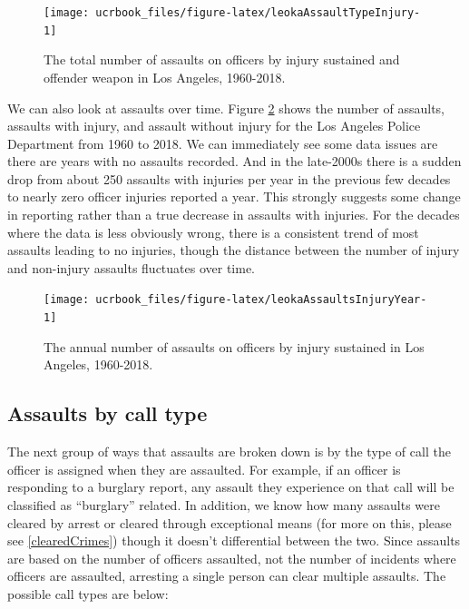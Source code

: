 \documentclass[
  12pt,
  openany]{book}
\begin{document}
\begin{figure}

{\centering \texttt{[image: ucrbook\_files/figure-latex/leokaAssaultTypeInjury-1]} 

}

\caption{The total number of assaults on officers by injury sustained and offender weapon in Los Angeles, 1960-2018.}\label{fig:leokaAssaultTypeInjury}
\end{figure}

We can also look at assaults over time. Figure \ref{fig:leokaAssaultsInjuryYear} shows the number of assaults, assaults with injury, and assault without injury for the Los Angeles Police Department from 1960 to 2018. We can immediately see some data issues are there are years with no assaults recorded. And in the late-2000s there is a sudden drop from about 250 assaults with injuries per year in the previous few decades to nearly zero officer injuries reported a year. This strongly suggests some change in reporting rather than a true decrease in assaults with injuries. For the decades where the data is less obviously wrong, there is a consistent trend of most assaults leading to no injuries, though the distance between the number of injury and non-injury assaults fluctuates over time.

\begin{figure}

{\centering \texttt{[image: ucrbook\_files/figure-latex/leokaAssaultsInjuryYear-1]} 

}

\caption{The annual number of assaults on officers by injury sustained in Los Angeles, 1960-2018.}\label{fig:leokaAssaultsInjuryYear}
\end{figure}

\hypertarget{assaults-by-call-type}{%
\subsection{Assaults by call type}\label{assaults-by-call-type}}

The next group of ways that assaults are broken down is by the type of call the officer is assigned when they are assaulted. For example, if an officer is responding to a burglary report, any assault they experience on that call will be classified as ``burglary'' related. In addition, we know how many assaults were cleared by arrest or cleared through exceptional means (for more on this, please see \ref{clearedCrimes}) though it doesn't differential between the two. Since assaults are based on the number of officers assaulted, not the number of incidents where officers are assaulted, arresting a single person can clear multiple assaults. The possible call types are below:
\end{document}
